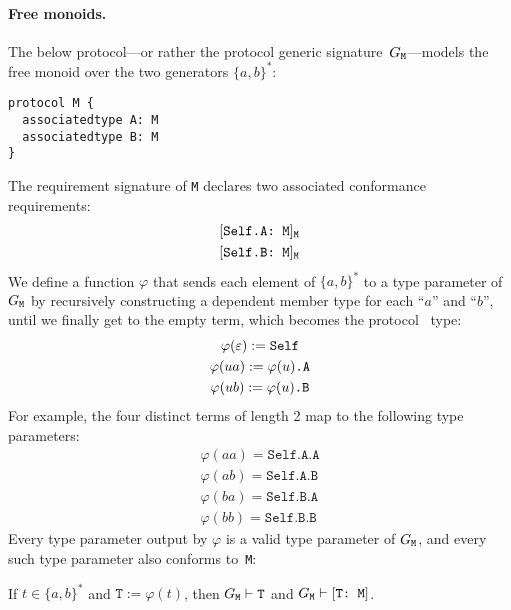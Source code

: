 \documentclass[../generics]{subfiles}
\begin{document}
\paragraph{Free monoids.} The below protocol---or rather the protocol generic signature~$G_\texttt{M}$---models the free monoid over the two generators $\{a,b\}^*$:
\begin{Verbatim}
protocol M {
  associatedtype A: M
  associatedtype B: M
}
\end{Verbatim}
The requirement signature of \texttt{M} declares two associated conformance requirements:
\begin{gather*}
\AssocConfReq{Self.A}{M}{M}\\
\AssocConfReq{Self.B}{M}{M}
\end{gather*}
We define a function $\varphi$ that sends each element of $\{a,b\}^*$ to a type parameter of $G_\texttt{M}$ by recursively constructing a dependent member type for each ``$a$'' and ``$b$'', until we finally get to the empty term, which becomes the protocol \tSelf\ type:
\begin{gather*}
\varphi(\varepsilon):=\texttt{Self}\\
\varphi(ua):=\texttt{$\varphi(u)$.A}\\
\varphi(ub):=\texttt{$\varphi(u)$.B}
\end{gather*}
For example, the four distinct terms of length 2 map to the following type parameters:
\begin{gather*}
\varphi(aa)=\texttt{Self.A.A}\\
\varphi(ab)=\texttt{Self.A.B}\\
\varphi(ba)=\texttt{Self.B.A}\\
\varphi(bb)=\texttt{Self.B.B}
\end{gather*}
Every type parameter output by $\varphi$ is a valid type parameter of $G_\texttt{M}$, and every such type parameter also conforms to~\texttt{M}:
\begin{proposition}\label{monoid type lemma} If $t\in \{a,b\}^*$ and $\texttt{T}:=\varphi(t)$, then $G_\texttt{M}\vdash\texttt{T}$ and $G_\texttt{M}\vdash[\texttt{T:~M}]$.
\end{proposition}
\end{document}
